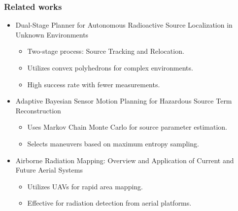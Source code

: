 \documentclass[aspectratio=169]{beamer}
\begin{document}
\begin{frame}
\frametitle{Related works}
\begin{itemize}
  \item Dual-Stage Planner for Autonomous Radioactive Source Localization in Unknown Environments \cite{zhu2024dual}
  \begin{itemize}
    \item Two-stage process: Source Tracking and Relocation.
    \item Utilizes convex polyhedrons for complex environments.
    \item High success rate with fewer measurements.
  \end{itemize}
  \item Adaptive Bayesian Sensor Motion Planning for Hazardous Source Term Reconstruction \cite{hutchinson2017adaptive}
  \begin{itemize}
    \item Uses Markov Chain Monte Carlo for source parameter estimation.
    \item Selects maneuvers based on maximum entropy sampling.
  \end{itemize}
  \item Airborne Radiation Mapping: Overview and Application of Current and Future Aerial Systems \cite{connor2016airborne}
  \begin{itemize}
    \item Utilizes UAVs for rapid area mapping.
    \item Effective for radiation detection from aerial platforms.
  \end{itemize} 
\end{itemize}
\end{frame}
\end{document}
